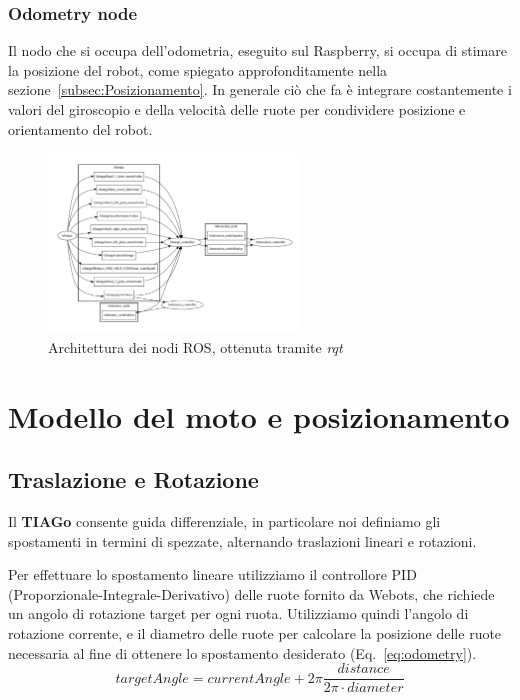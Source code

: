 \documentclass[a4paper]{article}
\begin{document}
	\subsubsection{Odometry node}\label{subsubsec:Odometry-node}
	Il nodo che si occupa dell'odometria, eseguito sul Raspberry, si occupa di stimare la posizione del
	robot, come spiegato approfonditamente nella
	sezione~\ref{subsec:Posizionamento}. In generale ciò che fa è integrare
	costantemente i valori del giroscopio e della velocità delle ruote per
	condividere posizione e orientamento del robot.
	 

	\begin{figure}[H]
		\centering
		\includegraphics[width=0.6\textwidth]{img/rosgraph.pdf}
		\caption{Architettura dei nodi ROS, ottenuta tramite \textit{rqt}}
		\label{fig:rosgraph}
	\end{figure}
	

	\section{Modello del moto e posizionamento}\label{sec:Modello-del-moto-e-posizionamento} 

	\subsection{Traslazione e Rotazione}\label{subsec:Spostamento}

	Il \textbf{TIAGo} consente guida differenziale, in particolare noi
	definiamo gli spostamenti in termini di spezzate, alternando traslazioni
	lineari e rotazioni.

	Per effettuare lo spostamento lineare utilizziamo il controllore PID
	(Proporzionale-Integrale-Derivativo) delle ruote fornito da Webots, che
	richiede un angolo di rotazione target per ogni ruota. Utilizziamo quindi
	l'angolo di rotazione corrente, e il diametro delle ruote per calcolare la
	posizione delle ruote necessaria al fine di ottenere lo spostamento
	desiderato (Eq.~\ref{eq:odometry}).
	\begin{equation}\label{eq:odometry}
	targetAngle =
	currentAngle+2\pi\frac    {distance}
					{2\pi \cdot diameter}
	\end{equation}
\end{document}
